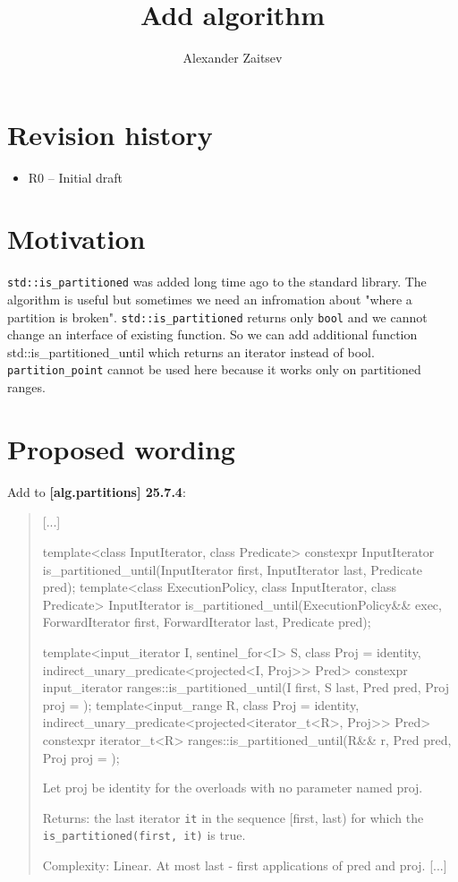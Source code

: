 \documentclass{wg21}
\title{Add \cc{std::is_partitioned_until} algorithm}
\author{Alexander Zaitsev}{zamazan4ik@tut.by, zamazan4ik@gmail.com}
\newcommand{\cc}[1]{\texttt{#1}}
\begin{document}
\maketitle

\section{Revision history}
\begin{itemize}
  \item R0 -- Initial draft
\end{itemize}

\section{Motivation}
\cc{std::is_partitioned} was added long time ago to the standard library. The algorithm is useful but sometimes we need an infromation about "where a partition is broken". \cc{std::is_partitioned} returns only \cc{bool} and we cannot change an interface of existing function. So we can add additional function {std::is_partitioned_until} which returns an iterator instead of bool. \cc{partition_point} cannot be used here because it works only on partitioned ranges.

\section{Proposed wording}
Add to \textbf{[alg.partitions] 25.7.4}:
\begin{quote}
[...]	
\begin{itemdecl}
template<class InputIterator, class Predicate>
  constexpr InputIterator is_partitioned_until(InputIterator first, InputIterator last,
                                               Predicate pred);
template<class ExecutionPolicy, class InputIterator, class Predicate>
  InputIterator is_partitioned_until(ExecutionPolicy&& exec, ForwardIterator first,
                                     ForwardIterator last, Predicate pred);
\end{itemdecl}

\begin{itemdecl}
template<input_iterator I, sentinel_for<I> S, class Proj = identity,
         indirect_unary_predicate<projected<I, Proj>> Pred>
  constexpr input_iterator ranges::is_partitioned_until(I first, S last, Pred pred,
                                                        Proj proj = {});	
template<input_range R, class Proj = identity, 
         indirect_unary_predicate<projected<iterator_t<R>, Proj>> Pred>
  constexpr iterator_t<R> ranges::is_partitioned_until(R&& r, Pred pred, Proj proj = {});
\end{itemdecl}
    Let proj be identity{} for the overloads with no parameter named proj.
    
    Returns: the last iterator \cc{it} in the sequence [first, last) for which the \cc{is_partitioned(first, it)} is true.
    
    Complexity: Linear. At most last - first applications of pred and proj.
[...]
\end{quote}
\end{document}
